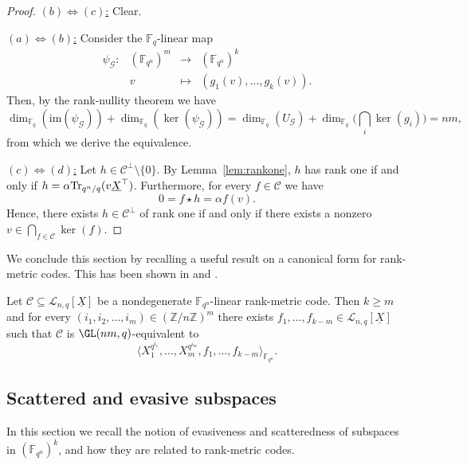 \begin{proof}
\underline{$(b)\Longleftrightarrow (c)$:} Clear.

\underline{$(a)\Longleftrightarrow (b)$:} Consider the $\mathbb{F}_q$-linear map
$$\begin{array}{rccl}\psi_\mathcal{G}:&({\mathbb F}_{q^n})^m &\longrightarrow & ({\mathbb F}_{q^n})^k \\
&v & \longmapsto & (g_1(v),\ldots,g_k(v)).
\end{array}$$
Then, by the rank-nullity theorem we have 
$$ \dim_{\mathbb{F}_q}(\mathrm{im}(\psi_\mathcal{G}))+\dim_{\mathbb{F}_q}(\ker(\psi_{\mathcal{G}}))=\dim_{\mathbb{F}_q}(U_\mathcal{G})+\dim_{\mathbb{F}_q}\Big(\bigcap_i\ker(g_i)\Big)=nm,$$
from which we derive the equivalence.

 \underline{$(c)\Longleftrightarrow (d)$:}  Let $h\in \mathcal{C}^\perp\setminus\{0\}$. By Lemma~\ref{lem:rankone}, $h$ has rank one if and only if $h=\alpha {\rm Tr}_{q^n/q}(v \underline{X}^\top)$. Furthermore, 
 for every $f\in \mathcal{C}$ we have
 $$0=f\star h=\alpha f(v).$$
 Hence, there exists $h\in\mathcal{C}^\perp$ of rank one if and only if there exists a nonzero \mbox{$v\in\bigcap_{f\in\mathcal{C}} \ker(f)$}.
 \end{proof}

We conclude this section by recalling a useful result on a canonical form for rank-metric codes. This has been shown in \cite[Corollary IV.10]{polverino2023divisible} and \cite[Theorem 5.3]{alfarano2023critical}.
\begin{prop}\label{prop:standard_form}
    Let $\mathcal{C}\subseteq \mathcal{L}_{n,q}[\underline{X}]$ be a nondegenerate ${\mathbb F}_{q^n}$-linear rank-metric code. Then $k\ge m$ and for every $(i_1, i_2,\ldots, i_m) \in (\mathbb{Z}/n\mathbb{Z})^m$ there exists $f_{1},\ldots, f_{k-m} \in \mathcal{L}_{n,q}[\underline{X}]$ such that $\mathcal{C}$ is $\GL(nm,q)$-equivalent to
    $$\langle X_1^{q^{i_1}},\ldots,X_m^{q^{i_m}},f_{1},\ldots,f_{k-m} \rangle_{{\mathbb F}_{q^n}}.$$
\end{prop}

\subsection{Scattered and evasive subspaces}

In this section we recall the notion of evasiveness and scatteredness of subspaces in $(\mathbb{F}_{q^n})^k$, and how they are related to rank-metric codes.


